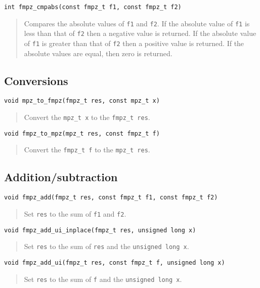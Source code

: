 \documentclass[a4paper,10pt]{article}
\newcommand{\code}{\lstinline}
\begin{document}
\begin{lstlisting}
int fmpz_cmpabs(const fmpz_t f1, const fmpz_t f2)
\end{lstlisting}
\begin{quote}
Compares the absolute values of \code{f1} and \code{f2}. If the absolute value of \code{f1} is less than that of \code{f2} then a negative value is returned. If the absolute value of \code{f1} is greater than that of \code{f2} then a positive value is returned. If the absolute values are equal, then zero is returned. 
\end{quote}

\subsection{Conversions}

\begin{lstlisting}
void mpz_to_fmpz(fmpz_t res, const mpz_t x)
\end{lstlisting}
\begin{quote}
Convert the \code{mpz_t x} to the \code{fmpz_t res}. 
\end{quote}

\begin{lstlisting}
void fmpz_to_mpz(mpz_t res, const fmpz_t f)
\end{lstlisting}
\begin{quote}
Convert the \code{fmpz_t f} to the \code{mpz_t res}. 
\end{quote}

\subsection{Addition/subtraction}

\begin{lstlisting}
void fmpz_add(fmpz_t res, const fmpz_t f1, const fmpz_t f2)
\end{lstlisting}
\begin{quote}
Set \code{res} to the sum of \code{f1} and \code{f2}.
\end{quote}

\begin{lstlisting}
void fmpz_add_ui_inplace(fmpz_t res, unsigned long x)
\end{lstlisting}
\begin{quote}
Set \code{res} to the sum of \code{res} and the \code{unsigned long x}.
\end{quote}

\begin{lstlisting}
void fmpz_add_ui(fmpz_t res, const fmpz_t f, unsigned long x)
\end{lstlisting}
\begin{quote}
Set \code{res} to the sum of \code{f} and the \code{unsigned long x}.
\end{quote}
\end{document}
